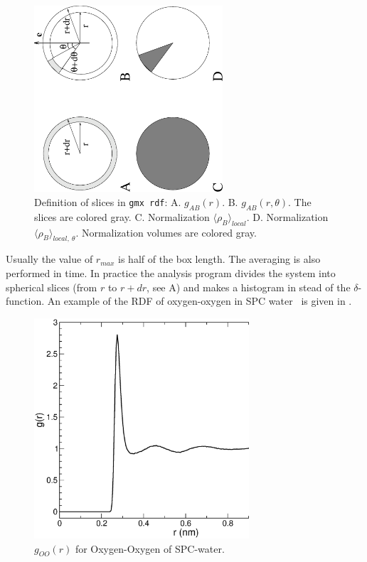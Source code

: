 \begin{figure}
\centerline{
{\includegraphics[width=7cm]{plots/rdf}}}
\caption[Definition of slices in {\tt gmx rdf}.]{Definition of slices
in {\tt gmx rdf}: A. $g_{AB}(r)$. B. $g_{AB}(r,\theta)$. The slices are
colored gray. C. Normalization $\langle\rho_B\rangle_{local}$. D. Normalization
$\langle\rho_B\rangle_{local,\:\theta }$. Normalization volumes are colored gray.}
\label{fig:rdfex}
\end{figure}

Usually the value of $r_{max}$ is half of the box length.  The
averaging is also performed in time.  In practice the analysis program
{\tt {}} divides the system into spherical slices (from $r$ to
$r+dr$, see A) and makes a histogram in stead of
the $\delta$-function. An example of the RDF of oxygen-oxygen in
SPC water~\cite{Berendsen81} is given in .

\begin{figure}
\centerline{
{\includegraphics[width=8cm]{plots/rdfO-O}}}
\caption{$g_{OO}(r)$ for Oxygen-Oxygen of SPC-water.}
\label{fig:rdf}
\end{figure}

